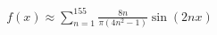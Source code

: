 \documentclass[preview]{standalone}
\begin{document}
\begin{align*}
f(x) \approx \sum_{n=1}^{155} \frac{8n}{\pi(4n^2-1)} \sin(2nx)
\end{align*}
\end{document}
